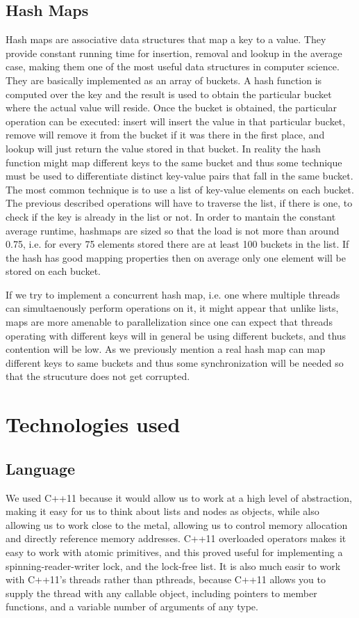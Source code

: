 \documentclass[11pt]{article}
\begin{document}
\subsection{Hash Maps} \label{ssec:bgmap}
Hash maps are associative data structures that map a
key to a value. They provide constant running time for insertion, removal and lookup in the
average case, making them one of the most useful data structures in computer
science. They are basically implemented as an array of buckets. A hash function
is computed over the key and the result is used to obtain the particular bucket
where the actual value will reside. Once the bucket is obtained, the particular
operation can be executed: insert will insert the value in that particular
bucket, remove will remove it from the bucket if it was there in the first
place,  and lookup will just return the value stored in that bucket. In reality
the hash function might map different keys to the same bucket and thus some
technique must be used to differentiate distinct key-value pairs that fall in the
same bucket. The most common technique is to use a list of key-value elements on
each bucket. The previous described operations will have to traverse the list, if
there is one, to check if the key is already in the list or not. In order to
mantain the constant average runtime, hashmaps are sized so that the load is not
more than around 0.75, i.e. for every 75 elements stored there are at least 100 buckets
in the list. If the hash has good mapping properties then on average only one
element will be stored on each bucket.

If we try to implement a concurrent hash map, i.e. one where multiple
threads can simultaenously perform operations on it, it might appear that
unlike lists, maps are more amenable to parallelization since one can expect that
threads operating with different keys will in general be using different buckets, and
thus contention will be low.
As we previously mention a real hash map can map different keys to same buckets
and thus some synchronization will be needed so that the strucuture does not get
corrupted.

\section{Technologies used}
\subsection{Language}
We used C++11 because it would allow us to work at a high level of abstraction,
making it easy for us to think about lists and nodes as objects, while also
allowing us to work close to the metal, allowing us to control memory allocation
and directly reference memory addresses. C++11 overloaded operators makes it
easy to work with atomic primitives, and this proved useful for implementing a
spinning-reader-writer lock, and the lock-free list. It is also much easir to
work with C++11's threads rather than pthreads, because C++11 allows you to
supply the thread with any callable object, including pointers to member
functions, and a variable number of arguments of any type.
\end{document}
